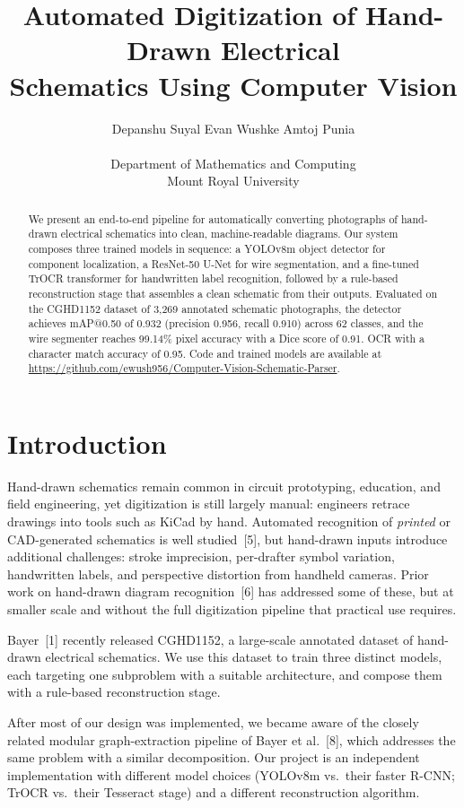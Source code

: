 \documentclass{article}
\title{Automated Digitization of Hand-Drawn Electrical\\ Schematics Using Computer Vision}
\author{
  Depanshu Suyal \quad Evan Wushke \quad Amtoj Punia \\
  \\
  Department of Mathematics and Computing \\
  Mount Royal University \\
}
\begin{document}
\maketitle

\begin{abstract}
We present an end-to-end pipeline for automatically converting 
photographs of hand-drawn electrical schematics into clean, 
machine-readable diagrams. Our system composes three trained models 
in sequence: a YOLOv8m object detector for component localization, 
a ResNet-50 U-Net for wire segmentation, and a fine-tuned TrOCR 
transformer for handwritten label recognition, followed by a 
rule-based reconstruction stage that assembles a clean schematic 
from their outputs. Evaluated on the CGHD1152 dataset of 3{,}269 
annotated schematic photographs, the detector achieves mAP@0.50 
of 0.932 (precision 0.956, recall 0.910) across 62 classes, and 
the wire segmenter reaches 99.14\% pixel accuracy with a Dice score 
of 0.91. OCR with a character match accuracy of 0.95.
Code and trained models are available at 
\url{https://github.com/ewush956/Computer-Vision-Schematic-Parser}.
\end{abstract}

\section{Introduction}

Hand-drawn schematics remain common in circuit prototyping, education,
and field engineering, yet digitization is still largely manual: engineers
retrace drawings into tools such as KiCad by hand. Automated recognition of \emph{printed} or CAD-generated schematics 
is well studied~[5], but hand-drawn inputs introduce additional 
challenges: stroke imprecision, per-drafter symbol variation, 
handwritten labels, and perspective distortion from handheld cameras. 
Prior work on hand-drawn diagram recognition~[6] has addressed some 
of these, but at smaller scale and without the full digitization 
pipeline that practical use requires.

Bayer~[1] recently released CGHD1152, a large-scale annotated
dataset of hand-drawn electrical schematics. We use this dataset to
train three distinct models, each targeting one subproblem with a
suitable architecture, and compose them with a rule-based
reconstruction stage.

After most of our design was implemented, we became aware of the
closely related modular graph-extraction pipeline of Bayer et al.~[8],
which addresses the same problem with a similar decomposition. Our
project is an independent implementation with different model choices
(YOLOv8m vs.\ their faster R-CNN; TrOCR vs.\ their Tesseract stage)
and a different reconstruction algorithm.
\end{document}
